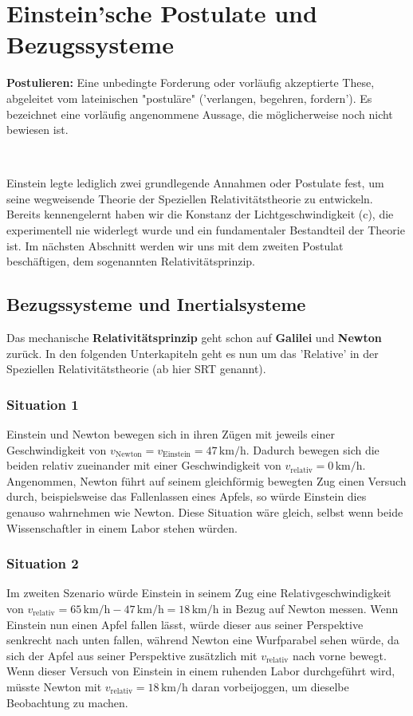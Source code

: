\documentclass[a4paper]{report}
\begin{document}
\chapter{Einstein'sche Postulate und Bezugssysteme}
\begin{tcolorbox}
	\textbf{Postulieren:} Eine unbedingte Forderung oder vorläufig akzeptierte These, abgeleitet vom lateinischen "postulāre" ('verlangen, begehren, fordern'). Es bezeichnet eine vorläufig angenommene Aussage, die möglicherweise noch nicht bewiesen ist.
\end{tcolorbox}\
\begin{flushleft}
	Einstein legte lediglich zwei grundlegende Annahmen oder Postulate fest, um seine wegweisende Theorie der Speziellen Relativitätstheorie zu entwickeln. Bereits kennengelernt haben wir die Konstanz der Lichtgeschwindigkeit (c), die experimentell nie widerlegt wurde und ein fundamentaler Bestandteil der Theorie ist. 
	Im nächsten Abschnitt werden wir uns mit dem zweiten Postulat beschäftigen, dem sogenannten Relativitätsprinzip.	
\end{flushleft}
\section{Bezugssysteme und Inertialsysteme}
Das mechanische \textbf{Relativitätsprinzip} geht schon auf \textbf{Galilei} und \textbf{Newton} zurück. In den folgenden Unterkapiteln geht es nun um das 'Relative' in der Speziellen Relativitätstheorie (ab hier SRT genannt).
\subsection{Situation 1}
Einstein und Newton bewegen sich in ihren Zügen mit jeweils einer Geschwindigkeit von \(v_{\text{Newton}} = v_{\text{Einstein}} = 47 \, \text{km/h}\). Dadurch bewegen sich die beiden relativ zueinander mit einer Geschwindigkeit von \(v_{\text{relativ}} = 0 \, \text{km/h}\).
Angenommen, Newton führt auf seinem gleichförmig bewegten Zug einen Versuch durch, beispielsweise das Fallenlassen eines Apfels, so würde Einstein dies genauso wahrnehmen wie Newton. Diese Situation wäre gleich, selbst wenn beide Wissenschaftler in einem Labor stehen würden.
\subsection{Situation 2}
Im zweiten Szenario würde Einstein in seinem Zug eine Relativgeschwindigkeit von \(v_{\text{relativ}} = 65 \, \text{km/h} - 47 \, \text{km/h} = 18 \, \text{km/h}\) in Bezug auf Newton messen. Wenn Einstein nun einen Apfel fallen lässt, würde dieser aus seiner Perspektive senkrecht nach unten fallen, während Newton eine Wurfparabel sehen würde, da sich der Apfel aus seiner Perspektive zusätzlich mit \(v_{\text{relativ}}\) nach vorne bewegt.
Wenn dieser Versuch von Einstein in einem ruhenden Labor durchgeführt wird, müsste Newton mit \(v_{\text{relativ}} = 18 \, \text{km/h}\) daran vorbeijoggen, um dieselbe Beobachtung zu machen.
\end{document}
